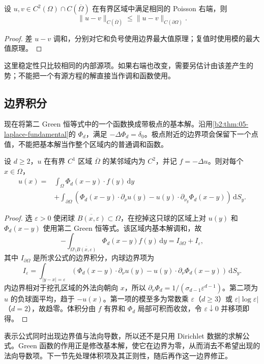 \begin{corollary}[边界数据的一致稳定性]\label{b2:cor:13-dirichlet-stability}
设 \(u,v\in C^2(\Omega)\cap C(\overline\Omega)\) 在有界区域中满足相同的 Poisson 右端，则
\[
 \|u-v\|_{C(\overline\Omega)}\leq\|u-v\|_{C(\partial\Omega)}.
\]
\end{corollary}
\begin{proof}
差 \(u-v\) 调和，分别对它和负号使用边界最大值原理；复值时使用模的最大值原理。
\end{proof}

这里稳定性只比较相同的内部源项。如果右端也改变，需要另估计由该差产生的势；不能把一个有源方程的解直接当作调和函数使用。

\subsection{边界积分}
\label{b2:subsec:130204}

现在将第二 Green 恒等式中的一个函数换成带极点的基本解。沿用\cref{b2:thm:05-laplace-fundamental}的 \(\Phi_d\)，满足 \(-\Delta\Phi_d=\delta_0\)。极点附近的边界项会保留下一个点值，不能把基本解当作整个区域内的普通调和函数。

\begin{theorem}\label{b2:thm:13-green-representation}
设 \(d\geq2\)，\(u\) 在有界 \(C^1\) 区域 \(\overline\Omega\) 的某邻域内为 \(C^2\)，并记 \(f=-\Delta u\)。则对每个 \(x\in\Omega\)，
\begin{equation}\label{b2:eq:13-green-representation}
 \begin{aligned}
 u(x)={}&\int_\Omega\Phi_d(x-y)\cdot f(y)\,\mathrm{d}y\\
 &+\int_{\partial\Omega}
 \left(\Phi_d(x-y)\cdot\partial_\nu u(y)
       -u(y)\cdot\partial_{\nu_y}\Phi_d(x-y)\right)\,\mathrm{d}S_y.
 \end{aligned}
\end{equation}
\end{theorem}
\begin{proof}
选 \(\varepsilon>0\) 使闭球 \(\overline{B(x,\varepsilon)}\subset\Omega\)，在挖掉这只球的区域上对 \(u(y)\) 和 \(\Phi_d(x-y)\) 使用第二 Green 恒等式。该区域内基本解调和，故
\[
 -\int_{\Omega\setminus\overline{B(x,\varepsilon)}}\Phi_d(x-y)f(y)\,\mathrm{d}y
 =I_{\partial\Omega}+I_\varepsilon,
\]
其中 \(I_{\partial\Omega}\) 是所求公式的边界积分，内球边界项为
\[
 I_\varepsilon=\int_{|y-x|=\varepsilon}
 \left(\Phi_d(x-y)\cdot\partial_\nu u(y)
 -u(y)\cdot\partial_\nu\Phi_d(x-y)\right)\,\mathrm{d}S_y.
\]
内边界相对于挖孔区域的外法向朝向 \(x\)，所以 \(\partial_\nu\Phi_d=1/(\sigma_{d-1}\varepsilon^{d-1})\)。第二项为 \(u\) 的负球面平均，趋于 \(-u(x)\)。第一项的模至多为常数乘 \(\varepsilon\)（\(d\geq3\)）或 \(\varepsilon|\log\varepsilon|\)（\(d=2\)），故趋零。体积分由 \(f\) 有界和 \(\Phi_d\) 局部可积而收敛，令 \(\varepsilon\downarrow0\) 并移项即得。
\end{proof}

表示公式同时出现边界值与法向导数，所以还不是只用 Dirichlet 数据的求解公式。Green 函数的作用正是修改基本解，使它在边界为零，从而消去不希望出现的法向导数项。下一节先处理体积项及其正则性，随后再作这一边界修正。
